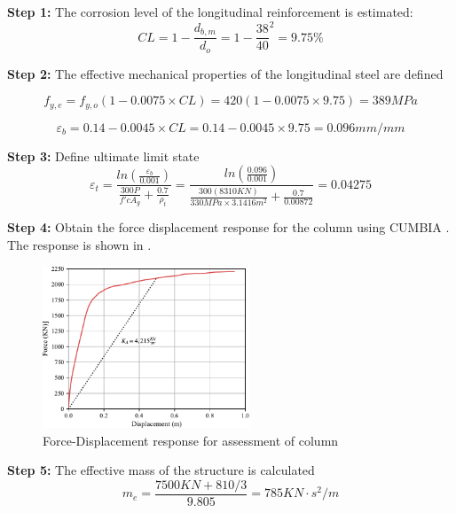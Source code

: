\textbf{Step 1:} The corrosion level of the longitudinal reinforcement is estimated:
\begin{displaymath}
    CL=1-\frac{d_{b,m}}{d_{o}}=1-\frac{38}{40}^2=9.75\%
\end{displaymath}

\textbf{Step 2:} The effective mechanical properties of the longitudinal steel are defined

\begin{displaymath}
    f_{y,e}=f_{y,o}(1-0.0075\times CL)=420(1-0.0075\times 9.75)=389 MPa
\end{displaymath}

\begin{displaymath}
    \varepsilon_{b}=0.14-0.0045 \times CL = 0.14-0.0045 \times 9.75 = 0.096 mm/mm
\end{displaymath}

\textbf{Step 3:} Define ultimate limit state
\begin{displaymath}
    \varepsilon_{t}=\frac{ln(\frac{\varepsilon_{b}}{0.001})}{\frac{300P}{f'c A_{g}}+\frac{0.7}{\rho_{t}}}=\frac{ln(\frac{0.096}{0.001})}{\frac{300(8310KN)}{330MPa \times 3.1416 m^2}+\frac{0.7}{0.00872}}=0.04275
\end{displaymath}

\textbf{Step 4:} Obtain the force displacement response for the column using CUMBIA \cite{Montejo2007}. The response is shown in .

\begin{figure}[htbp]
	\centering
	\includegraphics[width=0.55\textwidth]{VAC Thesis 2.0/Chapter-6/figs/Force_Displacement_Assessment_9_75.pdf}
	\caption{Force-Displacement response for assessment of column}
	\label{fig:force_displacement_assessment}
\end{figure}

\textbf{Step 5:} The effective mass of the structure is calculated
\begin{displaymath}
    m_e=\frac{7500 KN + 810/3}{9.805}=785 KN \cdot s^2/m
\end{displaymath}


